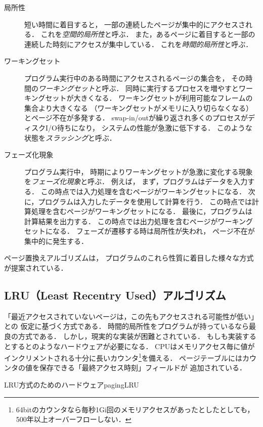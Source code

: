 \begin{description}
\item[局所性]
  短い時間に着目すると，
  一部の連続したページが集中的にアクセスされる．
  これを\emph{空間的局所性}と呼ぶ．
  また，あるページに着目すると一部の連続した時刻にアクセスが集中している．
  これを\emph{時間的局所性}と呼ぶ．
\item[ワーキングセット]
  プログラム実行中のある時間にアクセスされるページの集合を，
  その時間の\emph{ワーキングセット}と呼ぶ．
  同時に実行するプロセスを増やすとワーキングセットが大きくなる．
  ワーキングセットが利用可能なフレームの集合より大きくなる
  （ワーキングセットがメモリに入り切らなくなる）とページ不在が多発する．
  swap-in/outが繰り返され多くのプロセスがディスクI/O待ちになり，
  システムの性能が急激に低下する．
  このような状態を\emph{スラッシング}と呼ぶ．
\item[フェーズ化現象]
  プログラム実行中，
  時期によりワーキングセットが急激に変化する現象を\emph{フェーズ化現象}と呼ぶ．
  例えば，
  まず，プログラムはデータを入力する．
  この時点では入力処理を含むページがワーキングセットになる．
  次に，プログラムは入力したデータを使用して計算を行う．
  この時点では計算処理を含むページがワーキングセットになる．
  最後に，プログラムは計算結果を出力する．
  この時点では出力処理を含むページがワーキングセットになる．
  フェーズが遷移する時は局所性が失われ，
  ページ不在が集中的に発生する．
\end{description}

ページ置換えアルゴリズムは，
プログラムのこれら性質に着目した様々な方式が提案されている．

\subsection{LRU（Least Recentry Used）アルゴリズム}
「最近アクセスされていないページは，この先もアクセスされる可能性が低い」との
仮定に基づく方式である．
時間的局所性をプログラムが持っているなら最良の方式である．
しかし，現実的な実装が困難とされている．
もしも実装するとするとのようなハードウェアが必要になる．
CPUはメモリアクセス毎に値がインクリメントされる十分に長いカウンタ\footnote{
64bitのカウンタなら毎秒1Gi回のメモリアクセスがあったとしたとしても，
500年以上オーバーフローしない．
}を備える．
ページテーブルにはカウンタの値を保存できる「最終アクセス時刻」フィールドが
追加されている．

         {LRU方式のためのハードウェア}{pagingLRU}

